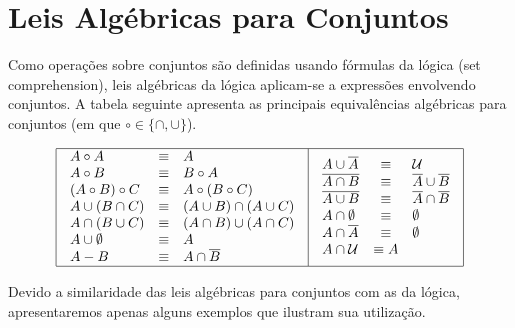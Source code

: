 \section{Leis Algébricas para Conjuntos}

Como operações sobre conjuntos são definidas usando fórmulas da lógica
(set comprehension), leis algébricas da lógica aplicam-se a expressões
envolvendo conjuntos. A tabela seguinte apresenta as principais
equivalências algébricas para conjuntos (em que $\circ\in\{\cap,\cup\}$).

\[
\begin{array}{|l|l|}
  \hline
  \begin{array}{lcl}
    A \circ A & \equiv & A\\
    A \circ B & \equiv & B \circ A \\
    (A \circ B) \circ C & \equiv & A \circ (B\circ C) \\
    A \cup (B\cap C) & \equiv & (A \cup B) \cap (A\cup C)\\
    A \cap (B\cup C) & \equiv & (A \cap B)\cup (A\cap C) \\
    A \cup \emptyset & \equiv & A \\
    A - B & \equiv & A \cap \overline{B}\\
  \end{array} &
  \begin{array}{lcl}
    A \cup \overline{A} & \equiv & \mathcal{U} \\
    \overline{A\cap B} & \equiv & \overline{A}\cup\overline{B}\\
    \overline{A\cup B} & \equiv & \overline{A}\cap\overline{B}\\
    A \cap \emptyset & \equiv & \emptyset\\
    A \cap \overline{A} & \equiv & \emptyset\\
    A \cap \mathcal{U} & \equiv A\\
  \end{array}
  \\ \hline
\end{array}
\]

Devido a similaridade das leis algébricas para conjuntos com as da
lógica, apresentaremos apenas alguns exemplos que ilustram sua utilização.

